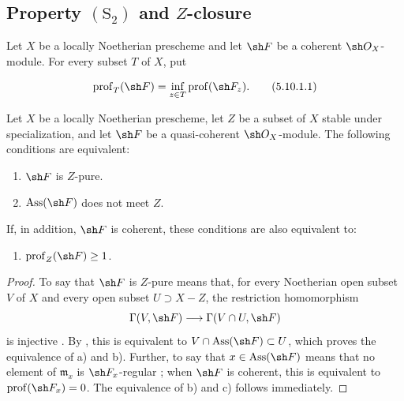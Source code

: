 \subsection{Property \texorpdfstring{$(\mathrm{S}_2)$}{(S2)} and
\texorpdfstring{$Z$}{Z}-closure}
\label{subsection:IV.5.10}

\begin{env}[5.10.1]
\label{IV.5.10.1}
Let $X$ be a locally Noetherian prescheme and let $\sh F$ be a
coherent $\sh O_X$-module.  For every subset $T$ of $X$, put
\end{env}

\begin{equation}
\label{IV.5.10.1.1}
\operatorname{prof}_T(\sh F)
 =\inf_{z\in T}\operatorname{prof}(\sh F_z).
\tag{5.10.1.1}
\end{equation}

\begin{proposition}[5.10.2]
\label{IV.5.10.2}
Let $X$ be a locally Noetherian prescheme, let $Z$ be a subset of
$X$ stable under specialization, and let $\sh F$ be a
quasi-coherent $\sh O_X$-module.  The following conditions are
equivalent:
\begin{enumerate}[{\rm a)}]
  \item $\sh F$ is $Z$-pure.
  \item $\operatorname{Ass}(\sh F)$ does not meet $Z$.
\end{enumerate}
If, in addition, $\sh F$ is coherent, these conditions are also
equivalent to:
\begin{enumerate}
  \item[\rm c)] $\operatorname{prof}_Z(\sh F)\geq1$.
\end{enumerate}
\end{proposition}

\begin{proof}
To say that $\sh F$ is $Z$-pure means that, for every Noetherian
open subset $V$ of $X$ and every open subset $U\supset X-Z$, the
restriction homomorphism
\[
  \Gamma(V,\sh F)\longrightarrow\Gamma(V\cap U,\sh F)
\]
is injective .  By , this is
equivalent to
$V\cap\operatorname{Ass}(\sh F)\subset U$, which proves the
equivalence of {\rm a)} and {\rm b)}.  Further, to say that
$x\in\operatorname{Ass}(\sh F)$ means that no element of
$\mathfrak m_x$ is $\sh F_x$-regular ; when
$\sh F$ is coherent, this is equivalent to
$\operatorname{prof}(\sh F_x)=0$.  The equivalence of {\rm b)} and
{\rm c)} follows immediately.
\end{proof}

